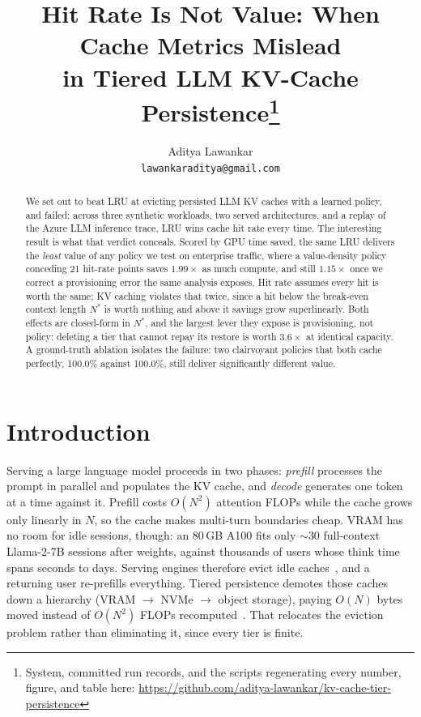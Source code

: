 \documentclass{article}
\title{Hit Rate Is Not Value: When Cache Metrics Mislead\\in Tiered LLM KV-Cache Persistence\thanks{System, committed run records, and the scripts regenerating every number, figure, and table here: \url{https://github.com/aditya-lawankar/kv-cache-tier-persistence}}}
\author{%
  Aditya Lawankar \\
  \texttt{lawankaraditya@gmail.com} \\
}
\begin{document}
\maketitle

\begin{abstract}
We set out to beat LRU at evicting persisted LLM KV caches with a learned policy, and failed: across three synthetic workloads, two served architectures, and a replay of the Azure LLM inference trace, LRU wins cache hit rate every time. The interesting result is what that verdict conceals. Scored by GPU time saved, the same LRU delivers the \emph{least} value of any policy we test on enterprise traffic, where a value-density policy conceding 21 hit-rate points saves $1.99\times$ as much compute, and still $1.15\times$ once we correct a provisioning error the same analysis exposes. Hit rate assumes every hit is worth the same; KV caching violates that twice, since a hit below the break-even context length $N^{*}$ is worth nothing and above it savings grow superlinearly. Both effects are closed-form in $N^{*}$, and the largest lever they expose is provisioning, not policy: deleting a tier that cannot repay its restore is worth $3.6\times$ at identical capacity. A ground-truth ablation isolates the failure: two clairvoyant policies that both cache perfectly, 100.0\% against 100.0\%, still deliver significantly different value.
\end{abstract}

\section{Introduction}

Serving a large language model proceeds in two phases: \emph{prefill} processes the prompt in parallel and populates the KV cache, and \emph{decode} generates one token at a time against it. Prefill costs $O(N^2)$ attention FLOPs while the cache grows only linearly in $N$, so the cache makes multi-turn boundaries cheap. VRAM has no room for idle sessions, though: an 80\,GB A100 fits only ${\sim}30$ full-context Llama-2-7B sessions after weights, against thousands of users whose think time spans seconds to days. Serving engines therefore evict idle caches~\cite{kwon2023pagedattention}, and a returning user re-prefills everything. Tiered persistence demotes those caches down a hierarchy (VRAM $\to$ NVMe $\to$ object storage), paying $O(N)$ bytes moved instead of $O(N^2)$ FLOPs recomputed~\cite{gao2024cachedattention,qin2025mooncake,zhong2024lmcache}. That relocates the eviction problem rather than eliminating it, since every tier is finite.
\end{document}
